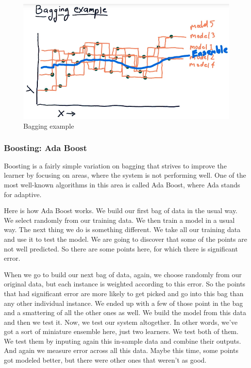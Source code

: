 \documentclass[12pt]{article}
\begin{document}
\begin{figure}[!ht]
\centering
\includegraphics[scale=0.45]{fig/fig95}
\caption{Bagging example}
\end{figure}

\subsubsection{Boosting: Ada Boost}

Boosting is a fairly simple variation on bagging that strives to improve the learner by focusing on areas, where the system is not performing well. One of the most well-known algorithms in this area is called Ada Boost, where Ada stands for adaptive. 

Here is how Ada Boost works. We build our first bag of data in the usual way. We select randomly from our training data. We then train a model in a usual way. The next thing we do is something different. We take all our training data and use it to test the model. We are going to discover that some of the points are not well predicted. So there are some points here, for which there is significant error. 

When we go to build our next bag of data, again, we choose randomly from our original data, but each instance is weighted according to this error. So the points that had significant error are more likely to get picked and go into this bag than any other individual instance. We ended up with a few of those point in the bag and a smattering of all the other ones as well. We build the model from this data and then we test it. Now, we test our system altogether. In other words, we've got a sort of miniature ensemble here, just two learners. We test both of them. We test them by inputing again this in-sample data and combine their outputs. And again we measure error across all this data. Maybe this time, some points got modeled better, but there were other ones that weren't as good. 
\end{document}

